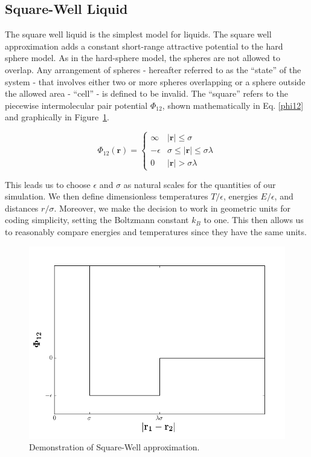 \documentclass[12pt]{article}
\renewcommand{\vec}[1]{\mathbf{#1}}
\begin{document}
\subsection{Square-Well Liquid}
The square well liquid is the simplest model for liquids\cite{theorysimpleliquids}. The square well approximation adds a constant short-range attractive potential to the hard sphere model. As in the hard-sphere model, the spheres are not allowed to overlap. Any arrangement of spheres - hereafter referred to as the ``state'' of the system - that involves either two or more spheres overlapping or a sphere outside the allowed area - ``cell'' - is defined to be invalid. The ``square'' refers to the piecewise intermolecular pair potential $\Phi_{12}$, shown mathematically in Eq. \ref{phi12} and graphically in Figure~\ref{sw_phi}.

\begin{equation} 
\Phi_{12}(\vec{r}) = \begin{cases}\infty & |\vec{r}|\leq \sigma\\ -\epsilon & \sigma \leq |\vec{r}| \leq \sigma\lambda\\ 0 & |\vec{r}| > \sigma\lambda \end{cases}
\label{phi12}
\end{equation}

This leads us to choose $\epsilon$ and $\sigma$ as natural scales for the quantities of our simulation. We then define dimensionless temperatures $T/\epsilon$, energies $E/\epsilon$, and distances $r/\sigma$. Moreover, we make the decision to work in geometric units for coding simplicity, setting the Boltzmann constant $k_B$ to one. This then allows us to reasonably compare energies and temperatures since they have the same units.

\begin{figure}
    \centering
    \includegraphics[width=.75\textwidth]{SWF-E.png}
    \caption{Demonstration of Square-Well approximation.}
    \label{sw_phi}
\end{figure}
\end{document}
